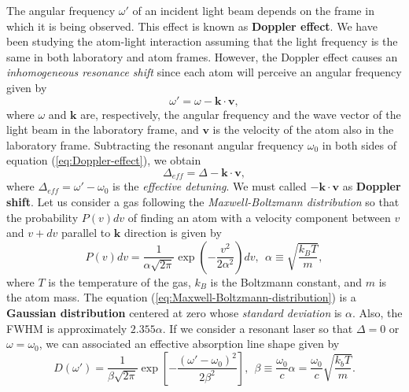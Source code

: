 {The angular frequency $ \omega' $ of an incident light beam depends on the frame in which it is being observed. This effect is known as \textbf{Doppler effect}. We have been studying the atom-light interaction assuming that the light frequency is the same in both laboratory and atom frames. However, the Doppler effect causes an \textit{inhomogeneous resonance shift} since each atom will perceive an angular frequency given by
\begin{equation}
	\omega' = \omega - \mathbf{k} \cdot \mathbf{v},
	\label{eq:Doppler-effect}
\end{equation}
where $ \omega $ and $ \mathbf{k} $ are, respectively, the angular frequency and the wave vector of the light beam in the laboratory frame, and $ \mathbf{v} $ is the velocity of the atom also in the laboratory frame. Subtracting the resonant angular frequency $ \omega_0 $ in both sides of equation (\ref{eq:Doppler-effect}), we obtain
\begin{equation}
	\Delta_{eff} = \Delta - \mathbf{k} \cdot \mathbf{v},
	\label{eq:Doppler-shift}
\end{equation}
where $ \Delta_{eff} = \omega' - \omega_0 $ is the \textit{effective detuning}. We must called $ -\mathbf{k} \cdot \mathbf{v} $ as \textbf{Doppler shift}. Let us consider a gas following the \textit{Maxwell-Boltzmann distribution} so that the probability $ P(v) dv $ of finding an atom with a velocity component between $ v $ and $ v + dv $ parallel to $ \mathbf{k} $ direction is given by
\begin{equation}
	P(v) dv = \frac{1}{\alpha\sqrt{2\pi}} \exp\left(-\frac{v^2}{2\alpha^2}\right) dv,\ \ \alpha \equiv \sqrt{\frac{k_B T}{m}},
	\label{eq:Maxwell-Boltzmann-distribution}
\end{equation}
where $ T $ is the temperature of the gas, $ k_B $ is the Boltzmann constant, and $ m $ is the atom mass. The equation (\ref{eq:Maxwell-Boltzmann-distribution}) is a \textbf{Gaussian distribution} centered at zero whose \textit{standard deviation} is $ \alpha $. Also, the FWHM is approximately $ 2.355 \alpha $. If we consider a resonant laser so that $ \Delta = 0 $ or $ \omega = \omega_0 $, we can associated an effective absorption line shape given by
\begin{equation}
	D(\omega') = \frac{1}{\beta \sqrt{2\pi}} \exp\left[-\frac{(\omega' - \omega_0)^2}{2\beta^2}\right],\ \ \beta \equiv \frac{\omega_0}{c} \alpha = \frac{\omega_0}{c} \sqrt{\frac{k_b T}{m}}.
\end{equation}

}
